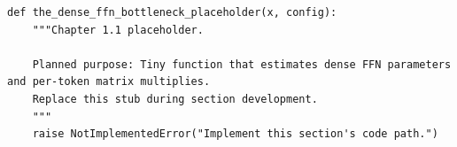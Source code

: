 \begin{lstlisting}[style=bookpython,caption={Planned code placeholder for the dense FFN bottleneck.},label={lst:ch01-the-dense-ffn-bottleneck}]
def the_dense_ffn_bottleneck_placeholder(x, config):
    """Chapter 1.1 placeholder.

    Planned purpose: Tiny function that estimates dense FFN parameters and per-token matrix multiplies.
    Replace this stub during section development.
    """
    raise NotImplementedError("Implement this section's code path.")
\end{lstlisting}
